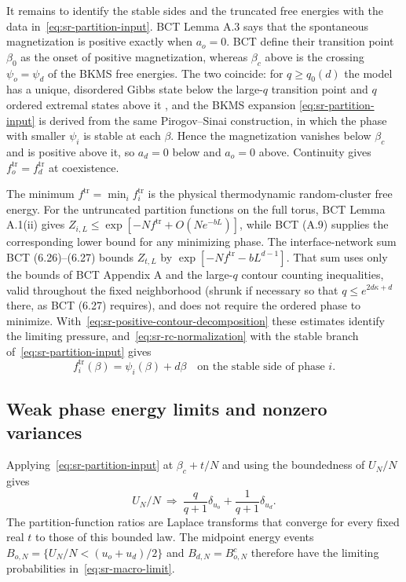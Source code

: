 It remains to identify the stable sides and the truncated free
energies with the data in~\eqref{eq:sr-partition-input}. BCT
Lemma A.3 says that the spontaneous
magnetization is positive exactly when $a_o=0$. BCT define their
transition point $\beta_0$ as the onset of positive magnetization,
whereas $\beta_c$ above is the crossing $\psi_o=\psi_d$ of the BKMS
free energies. The two coincide: for
$q\ge q_0(d)$ the model has a unique, disordered Gibbs state below the
large-$q$ transition point and $q$ ordered extremal states above it
\cite{KoteckyShlosman1982,LaanaitEtAl1991}, and the BKMS expansion
\eqref{eq:sr-partition-input} is derived from the same Pirogov--Sinai
construction, in which the phase with smaller $\psi_i$ is stable at
each $\beta$. Hence the magnetization vanishes below
$\beta_c$ and is positive above it, so $a_d=0$ below and $a_o=0$
above. Continuity gives $f_o^{\mathrm{tr}}=f_d^{\mathrm{tr}}$ at
coexistence.

The minimum $f^{\mathrm{tr}}=\min_i f_i^{\mathrm{tr}}$ is the physical
thermodynamic random-cluster free energy. For the untruncated
partition functions on the full torus, BCT Lemma A.1(ii) gives
$Z_{i,L}\le\exp[-Nf^{\mathrm{tr}}+O(Ne^{-bL})]$, while BCT (A.9)
supplies the corresponding lower bound for any minimizing phase. The
interface-network sum BCT (6.26)--(6.27) bounds $Z_{t,L}$ by
$\exp[-Nf^{\mathrm{tr}}-bL^{d-1}]$.
That sum uses only the bounds of BCT Appendix A and the large-$q$
contour counting inequalities, valid throughout the fixed neighborhood
(shrunk if necessary so that $q\le e^{2d\kappa+d}$ there, as BCT (6.27)
requires), and does not require the ordered phase to minimize.
With~\eqref{eq:sr-positive-contour-decomposition} these estimates
identify the limiting pressure, and~\eqref{eq:sr-rc-normalization}
with the stable branch of~\eqref{eq:sr-partition-input} gives
\begin{equation}
 f_i^{\mathrm{tr}}(\beta)=\psi_i(\beta)+d\beta
 \quad\text{on the stable side of phase }i.
 \label{eq:sr-stable-branch-identification}
\end{equation}

\subsection{Weak phase energy limits and nonzero variances}
\label{app:sr-weak}

Applying~\eqref{eq:sr-partition-input} at $\beta_c+t/N$ and using the
boundedness of $U_N/N$ gives
\begin{equation}
 U_N/N\ \Rightarrow\ \frac q{q+1}\delta_{u_o}
                           +\frac1{q+1}\delta_{u_d}.
 \label{eq:sr-macro-limit}
\end{equation}
The partition-function ratios are Laplace transforms that converge
for every fixed real $t$ to those of this bounded law. The
midpoint energy events $B_{o,N}=\{U_N/N<(u_o+u_d)/2\}$ and
$B_{d,N}=B_{o,N}^c$ therefore have the limiting probabilities
in~\eqref{eq:sr-macro-limit}.

